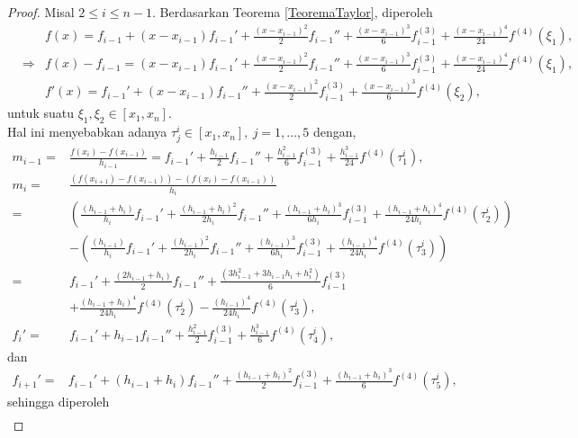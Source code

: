 \begin{proof}
    Misal $2 \leq i \leq n-1$. Berdasarkan Teorema \ref{TeoremaTaylor}, diperoleh
    \begin{align*}
        &&f(x) = f_{i-1} + (x-x_{i-1})f_{i-1}' + \frac{(x-x_{i-1})^2}{2}f_{i-1}'' + \frac{(x-x_{i-1})^3}{6}f_{i-1}^{(3)} + \frac{(x-x_{i-1})^4}{24}f^{(4)}(\xi_1),\\
        &\Rightarrow&f(x) - f_{i-1} = (x-x_{i-1})f_{i-1}' + \frac{(x-x_{i-1})^2}{2}f_{i-1}'' + \frac{(x-x_{i-1})^3}{6}f_{i-1}^{(3)} + \frac{(x-x_{i-1})^4}{24}f^{(4)}(\xi_1),\\
        &&f'(x) = f_{i-1}' + (x-x_{i-1})f_{i-1}'' + \frac{(x-x_{i-1})^2}{2}f_{i-1}^{(3)} + \frac{(x-x_{i-1})^3}{6}f^{(4)}(\xi_2),
    \end{align*}
    untuk suatu $\xi_1,\xi_2 \in [x_1,x_n]$.\\
    Hal ini menyebabkan adanya $\tau_j^i \in [x_1,x_n],~j=1,\dots,5$ dengan,
    \begin{align*}
        m_{i-1}=&\frac{f(x_{i})-f(x_{i-1})}{h_{i-1}}=f_{i-1}' + \frac{h_{i-1}}{2}f_{i-1}'' + \frac{h_{i-1}^2}{6}f_{i-1}^{(3)} + \frac{h_{i-1}^3}{24}f^{(4)}(\tau_1^i),\\
        m_{i}=&\frac{(f(x_{i+1})-f(x_{i-1}))-(f(x_{i})-f(x_{i-1}))}{h_{i}}\\
        =&\left( \frac{(h_{i-1}+h_i)}{h_i}f_{i-1}' + \frac{(h_{i-1}+h_i)^2}{2h_i}f_{i-1}'' + \frac{(h_{i-1}+h_i)^3}{6h_i}f_{i-1}^{(3)} + \frac{(h_{i-1}+h_i)^4}{24h_i}f^{(4)}(\tau_2^i) \right)\\
        &-\left( \frac{(h_{i-1})}{h_i}f_{i-1}' + \frac{(h_{i-1})^2}{2h_i}f_{i-1}'' + \frac{(h_{i-1})^3}{6h_i}f_{i-1}^{(3)} + \frac{(h_{i-1})^4}{24h_i}f^{(4)}(\tau_3^i) \right)\\
        =&f_{i-1}'+\frac{(2h_{i-1}+h_i)}{2}f_{i-1}''+\frac{(3h_{i-1}^2+3h_{i-1}h_i+h_{i}^2)}{6}f_{i-1}^{(3)}\\
        &+\frac{(h_{i-1}+h_i)^4}{24h_i}f^{(4)}(\tau_2^i)-\frac{(h_{i-1})^4}{24h_i}f^{(4)}(\tau_3^i),\\
        f_i' =& f_{i-1}' + h_{i-1}f_{i-1}'' + \frac{h_{i-1}^2}{2}f_{i-1}^{(3)} + \frac{h_{i-1}^3}{6}f^{(4)}(\tau_4^i),
    \end{align*}
    dan
    \begin{align*}
        f_{i+1}' =& f_{i-1}' + (h_{i-1}+h_i)f_{i-1}'' + \frac{(h_{i-1}+h_i)^2}{2}f_{i-1}^{(3)} + \frac{(h_{i-1}+h_i)^3}{6}f^{(4)}(\tau_5^i),
    \end{align*}
    sehingga diperoleh
    \begin{align*}

\end{align*}
\end{proof}
